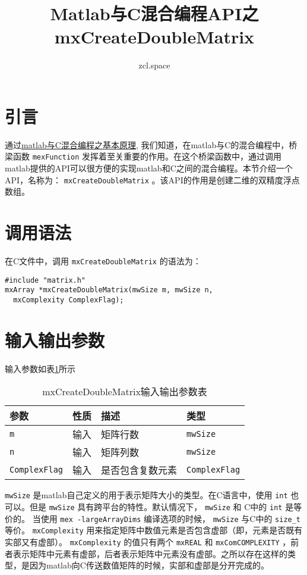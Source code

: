 \documentclass[10pt,a4paper,UTF8]{article}
\author{zcl.space}
\date{}
\title{Matlab与C混合编程API之mxCreateDoubleMatrix}
\begin{document}
\maketitle\xiaosihao
\tableofcontents\newpage\newpage


\section{引言}
\label{sec:orgheadline1}


通过\href{matlabandc.org}{matlab与C混合编程之基本原理}, 我们知道，在matlab与C的混合编程中，桥梁函数 \texttt{mexFunction} 发挥着至关重要的作用。在这个桥梁函数中，通过调用matlab提供的API可以很方便的实现matlab和C之间的混合编程。本节介绍一个API，名称为： \texttt{mxCreateDoubleMatrix} 。该API的作用是创建二维的双精度浮点数组。

\section{调用语法}
\label{sec:orgheadline2}


在C文件中，调用 \texttt{mxCreateDoubleMatrix} 的语法为：
\lstset{language=C,label= ,caption= ,captionpos=b,numbers=none}
\begin{lstlisting}
#include "matrix.h"
mxArray *mxCreateDoubleMatrix(mwSize m, mwSize n,
  mxComplexity ComplexFlag);
\end{lstlisting}

\section{输入输出参数}
\label{sec:orgheadline3}


输入参数如表\ref{tab:orgtable1}所示
\begin{table}[htb]
\caption{\label{tab:orgtable1}
mxCreateDoubleMatrix输入输出参数表}
\centering
\begin{tabular}{llll}
\hline
参数 & 性质 & 描述 & 类型\\
\hline
\texttt{m} & 输入 & 矩阵行数 & \texttt{mwSize}\\
\texttt{n} & 输入 & 矩阵列数 & \texttt{mwSize}\\
\texttt{ComplexFlag} & 输入 & 是否包含复数元素 & \texttt{ComplexFlag}\\
\hline
\end{tabular}
\end{table}

\texttt{mwSize} 是matlab自己定义的用于表示矩阵大小的类型。在C语言中，使用 \texttt{int} 也可以。但是 \texttt{mwSize} 具有跨平台的特性。默认情况下， \texttt{mwSize} 和 C中的 \texttt{int} 是等价的。 当使用 \texttt{mex -largeArrayDims} 编译选项的时候， \texttt{mwSize} 与C中的 \texttt{size\_t} 等价。 \texttt{mxComplexity} 用来指定矩阵中数值元素是否包含虚部（即，元素是否既有实部又有虚部）。 \texttt{mxComplexity} 的值只有两个 \texttt{mxREAL} 和 \texttt{mxComCOMPLEXITY} ，前者表示矩阵中元素有虚部，后者表示矩阵中元素没有虚部。之所以存在这样的类型，是因为matlab向C传送数值矩阵的时候，实部和虚部是分开完成的。
\end{document}

